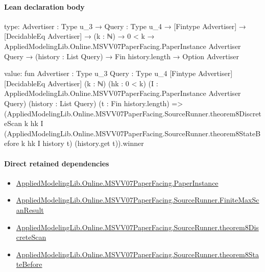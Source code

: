 \documentclass[10pt]{article}
\begin{document}
\paragraph{Lean declaration body}
\begin{ReviewVerbatim}
type:
{Advertiser : Type u_3} →
  {Query : Type u_4} →
    [Fintype Advertiser] →
      [DecidableEq Advertiser] →
        (k : ℕ) →
          0 < k →
            AppliedModelingLib.Online.MSVV07PaperFacing.PaperInstance Advertiser Query →
              (history : List Query) → Fin history.length → Option Advertiser

value:
fun {Advertiser : Type u_3} {Query : Type u_4} [Fintype Advertiser] [DecidableEq Advertiser] (k : ℕ) (hk : 0 < k)
    (I : AppliedModelingLib.Online.MSVV07PaperFacing.PaperInstance Advertiser Query) (history : List Query)
    (t : Fin history.length) =>
  (AppliedModelingLib.Online.MSVV07PaperFacing.SourceRunner.theorem8DiscreteScan k hk I
      (AppliedModelingLib.Online.MSVV07PaperFacing.SourceRunner.theorem8StateBefore k hk I history t)
      (history.get t)).winner
\end{ReviewVerbatim}

\paragraph{Direct retained dependencies}
\begin{itemize}\raggedright
\item \hyperlink{governing-declaration-11907576ec71eeb5}{Applied\allowbreak{}Modeling\allowbreak{}Lib.\allowbreak{}Online.\allowbreak{}MSVV07\allowbreak{}Paper\allowbreak{}Facing.\allowbreak{}Paper\allowbreak{}Instance}
\item \hyperlink{governing-declaration-ebb7db2383e5a26e}{Applied\allowbreak{}Modeling\allowbreak{}Lib.\allowbreak{}Online.\allowbreak{}MSVV07\allowbreak{}Paper\allowbreak{}Facing.\allowbreak{}Source\allowbreak{}Runner.\allowbreak{}Finite\allowbreak{}Max\allowbreak{}Scan\allowbreak{}Result}
\item \hyperlink{governing-declaration-6cdc2d586a6d4b33}{Applied\allowbreak{}Modeling\allowbreak{}Lib.\allowbreak{}Online.\allowbreak{}MSVV07\allowbreak{}Paper\allowbreak{}Facing.\allowbreak{}Source\allowbreak{}Runner.\allowbreak{}theorem8\allowbreak{}Discrete\allowbreak{}Scan}
\item \hyperlink{governing-declaration-3e982d8168757c59}{Applied\allowbreak{}Modeling\allowbreak{}Lib.\allowbreak{}Online.\allowbreak{}MSVV07\allowbreak{}Paper\allowbreak{}Facing.\allowbreak{}Source\allowbreak{}Runner.\allowbreak{}theorem8\allowbreak{}State\allowbreak{}Before}
\end{itemize}
\hypertarget{governing-declaration-58e15c5c9f71cb25}{}
\end{document}

